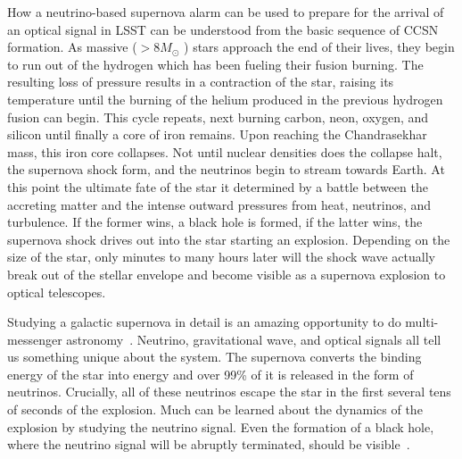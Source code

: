 \documentclass[11pt, letterpaper]{article}
\begin{document}
How a neutrino-based supernova alarm can be used to prepare for the
arrival of an optical signal in LSST can be understood from the basic
sequence of CCSN formation.  As massive ($ > 8 M_\odot$ ) stars
approach the end of their lives, they begin to run out of the hydrogen
which has been fueling their fusion burning.  The resulting loss of
pressure results in a contraction of the star, raising its temperature
until the burning of the helium produced in the previous hydrogen
fusion can begin. This cycle repeats, next burning carbon, neon,
oxygen, and silicon until finally a core of iron remains. Upon
reaching the Chandrasekhar mass, this iron core collapses.  Not until
nuclear densities does the collapse halt, the supernova shock form,
and the neutrinos begin to stream towards Earth.  At this point the
ultimate fate of the star it determined by a battle between the
accreting matter and the intense outward pressures from heat,
neutrinos, and turbulence. If the former wins, a black hole is formed,
if the latter wins, the supernova shock drives out into the star
starting an explosion.
%
Depending on the size of the star, only minutes to many
hours later will the shock wave actually break out of the stellar
envelope and become visible as a supernova explosion to optical
telescopes.

Studying a galactic supernova in detail is an amazing opportunity to
do multi-messenger astronomy~\cite{2016MNRAS.461.3296N}.  Neutrino,
gravitational wave, and optical signals all tell us something unique
about the system.  The supernova converts the binding energy of the
star into energy and over 99\% of it is released in the form of
neutrinos.  Crucially, all of these neutrinos escape the star in the
first several tens of seconds of the explosion. Much can be learned
about the dynamics of the explosion by studying the neutrino signal.
Even the formation of a black hole, where the neutrino signal will be
abruptly terminated, should be visible~\cite{2011ApJ...730...70O,
  2017hsn..book.1555O}.
\end{document}
